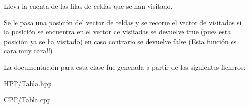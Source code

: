 Lleva la cuenta de las filas de celdas que se han visitado. 

Se le pasa una posición del vector de celdas y se recorre el vector de visitadas si la posición se encuentra en el vector de visitadas se devuelve true (pues esta posición ya se ha visitado) en caso contrario se devuelve false (Esta función es cara muy cara!!) 

La documentación para esta clase fue generada a partir de los siguientes ficheros\+:\begin{DoxyCompactItemize}
\item 
H\+P\+P/Tabla.\+hpp\item 
C\+P\+P/Tabla.\+cpp\end{DoxyCompactItemize}
